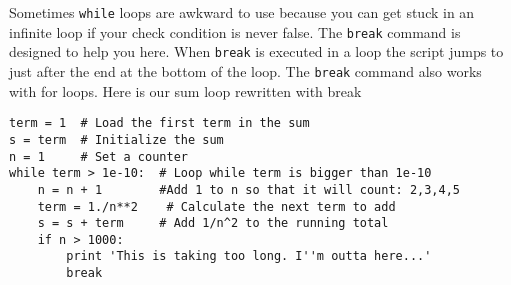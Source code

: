 Sometimes \texttt{while} loops are awkward to use because you can get
stuck in an infinite loop if your check condition is never false. The
\texttt{break} command is designed to help you here. When
\texttt{break} is executed in a loop the script jumps to just after
the end at the bottom of the loop. The \texttt{break} command also
works with for loops. Here is our sum loop rewritten with break
\begin{Verbatim}
term = 1  # Load the first term in the sum
s = term  # Initialize the sum 
n = 1     # Set a counter
while term > 1e-10:  # Loop while term is bigger than 1e-10
    n = n + 1        #Add 1 to n so that it will count: 2,3,4,5
    term = 1./n**2    # Calculate the next term to add
    s = s + term     # Add 1/n^2 to the running total
    if n > 1000:
        print 'This is taking too long. I''m outta here...'
        break
\end{Verbatim} 
